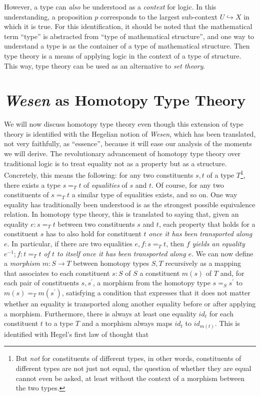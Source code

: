 \documentclass{article}
\begin{document}
However, a type can \emph{also} be understood as a \emph{context} for logic.  In this understanding, a proposition $p$ corresponds to the largest sub-context $U\hookrightarrow X$ in which it is true. For this identification, it should be noted that the mathematical term ``type'' is abstracted from ``type of mathematical structure'', and one way to understand a type is as the container of a type of mathematical structure. Then type theory is a means of applying logic in the context of a type of structure. This way, type theory can be used as an alternative to \emph{set theory}.


\section{\emph{Wesen} as Homotopy Type Theory}\label{Hott}
We will now discuss homotopy type theory even though this extension of type theory is identified with the Hegelian notion of \emph{Wesen}, which has been translated, not very faithfully, as ``essence'', because it will ease our analysis of the moments we will derive. The revolutionary advancement of homotopy type theory over traditional logic is to treat equality not as a property but as a structure. Concretely, this means the following: for any two constituents $s,t$ of a type $T$\footnote{But \emph{not} for constituents of different types, in other words, constituents of different types are not just not equal, the question of whether they are equal cannot even be asked, at least without the context of a morphism between the two types.}, there exists a type $s=_T t$ of \emph{equalities} of $s$ and $t$. Of course, for any two constituents of $s=_T t$ a similar type of equalities exists, and so on. One way equality has traditionally been understood is as the strongest possible equivalence relation. In homotopy type theory, this is translated to saying that, given an equality $e:s=_T t$ between two constituents $s$ and $t$, each property that holds for a constituent $s$ has to also hold for constituent $t$ \emph{once it has been transported along $e$}. In particular, if there are two equalities $e,f:s=_T t$, then \emph{$f$ yields an equality $e^{-1};f:t=_T t$ of $t$ to itself once it has been transported along $e$}. We can now define a \emph{morphism} $m:S\rightarrow T$ between homotopy types $S,T$ recursively as a mapping that associates to each constituent $s:S$ of $S$ a constituent $m(s)$ of $T$ and, for each pair of constituents $s,s^{\prime}$, a morphism from the homotopy type $s=_{S} s^{\prime}$ to $m(s)=_T m(s^{\prime})$, satisfying a condition that expresses that it does not matter whether an equality is transported along another equality before or after applying a morphism. Furthermore, there is always at least one equality $id_t$ for each constituent $t$ to a type $T$ and a morphism always maps $id_t$ to $id_{m(t)}$. This is identified with Hegel's first law of thought that 
\end{document}
